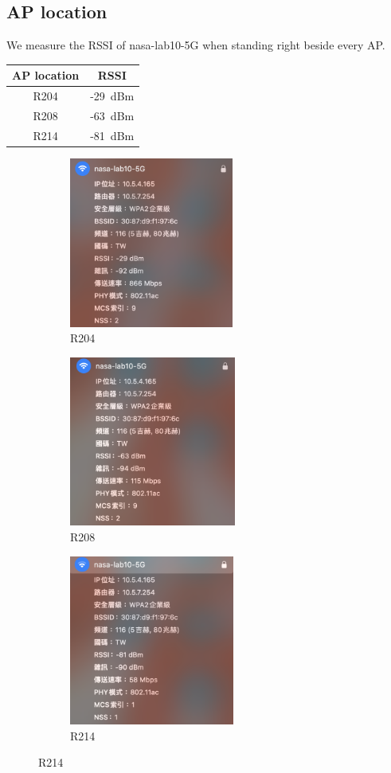 \documentclass[12pt, a4paper]{article}
\begin{document}
  \pagebreak
  \subsection{AP location}
  We measure the RSSI of nasa-lab10-5G when standing right beside every AP.
  \begin{table}[H]
    \begin{tabular}{|cc|}
      \hline
      \textbf{AP location} & \textbf{RSSI} \\\hline
       R204 & -29~dBm \\
       R208 & -63~dBm \\
       R214 & -81~dBm \\\hline
    \end{tabular}
  \end{table}
  \begin{figure}[H]
    \begin{subfigure}{0.32\textwidth}
      \includegraphics[height=5.6cm]{5G_closest.png}
      \caption{R204}
    \end{subfigure}
    \hfill
    \begin{subfigure}{0.32\textwidth}
      \includegraphics[height=5.6cm]{5G_R208.png}
      \caption{R208}
    \end{subfigure}
    \hfill
    \begin{subfigure}{0.32\textwidth}
      \includegraphics[height=5.6cm]{5G_R214.png}
      \caption{R214}
    \end{subfigure}
  \end{figure}
\end{document}
